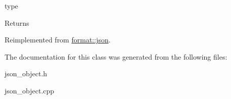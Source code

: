 type 

\begin{DoxyReturn}{Returns}

\end{DoxyReturn}


Reimplemented from \hyperlink{classformat_1_1json_a970027799aac71bf99e3f1d7264364dc}{format\+::json}.



The documentation for this class was generated from the following files\+:\begin{DoxyCompactItemize}
\item 
json\+\_\+object.\+h\item 
json\+\_\+object.\+cpp\end{DoxyCompactItemize}
